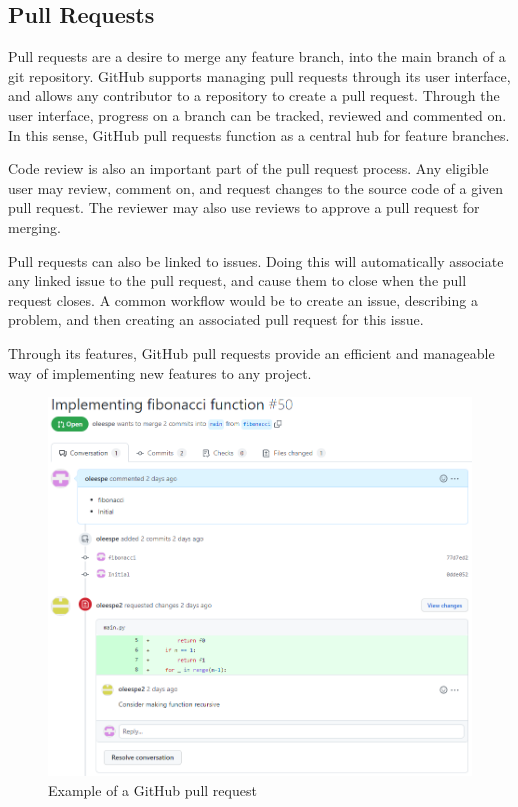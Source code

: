 \subsection{Pull Requests}

Pull requests are a desire to merge any feature branch, into the main branch of a git repository.
GitHub supports managing pull requests through its user interface, and allows any contributor to a repository to create a pull request.
Through the user interface, progress on a branch can be tracked, reviewed and commented on.
In this sense, GitHub pull requests function as a central hub for feature branches.

Code review is also an important part of the pull request process.
Any eligible user may review, comment on, and request changes to the source code of a given pull request.
The reviewer may also use reviews to approve a pull request for merging.

Pull requests can also be linked to issues.
Doing this will automatically associate any linked issue to the pull request, and cause them to close when the pull request closes.
A common workflow would be to create an issue, describing a problem, and then creating an associated pull request for this issue.

Through its features, GitHub pull requests provide an efficient and manageable way of implementing new features to any project.

\begin{figure}[ht]
    \centering
    \includegraphics[width=\textwidth]{photos/pull-request.PNG}
    \caption{Example of a GitHub pull request}
    \label{fig:pull-request}
\end{figure}

